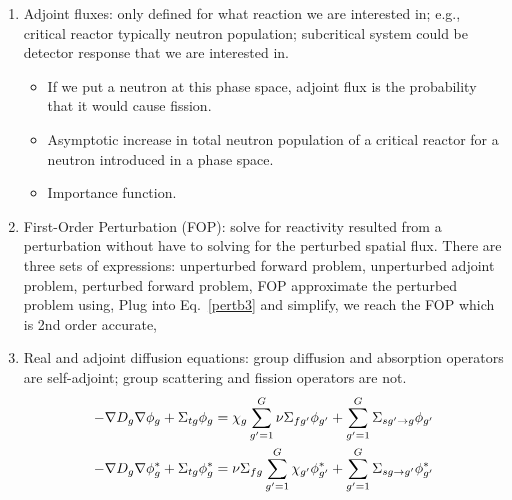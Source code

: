 \documentclass{school-22.211-notes}
\begin{document}
\clearpage
{}
\begin{enumerate}
\item Adjoint fluxes: only defined for what reaction we are interested in; e.g., critical reactor typically neutron population; subcritical system could be detector response that we are interested in.  
  \begin{itemize}
  \item If we put a neutron at this phase space, adjoint flux is the probability that it would cause fission. 
  \item Asymptotic increase in total neutron population of a critical reactor for a neutron introduced in a phase space. 
  \item Importance function. 
  \end{itemize}
  
\item  First-Order Perturbation (FOP): solve for reactivity resulted from a perturbation without have to solving for the perturbed spatial flux. There are three sets of expressions: unperturbed forward problem, unperturbed adjoint problem, perturbed forward problem, 
FOP approximate the perturbed problem using, 
Plug into Eq.~\ref{pertb3} and simplify, we reach the FOP which is 2nd order accurate, 


  \item Real and adjoint diffusion equations: group diffusion and absorption operators are self-adjoint; group scattering and fission operators are not. 
    \begin{align}
      -\nabla D_g  \nabla \phi_g + \Sigma_{tg} \phi_g &= \chi_g \displaystyle\sum_{g'=1}^G \nu \Sigma_{fg'}  \phi_{g'} + \displaystyle\sum_{g'=1}^G \Sigma_{sg'\to g} \phi_{g'} \\
      -\nabla D_g  \nabla \phi_g^* + \Sigma_{tg}  \phi_g^* &= \nu \Sigma_{fg}  \displaystyle\sum_{g'=1}^G  \chi_{g'} \phi_{g'}^*  + \displaystyle\sum_{g'=1}^G \Sigma_{sg\to g'}  \phi_{g'}^*
    \end{align}


\end{enumerate}
\end{document}
